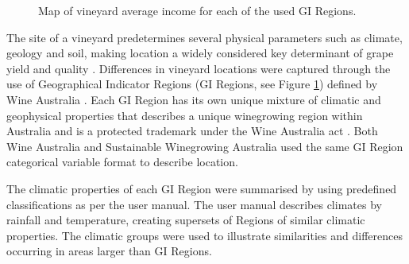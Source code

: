 \documentclass[review,12pt,authoryear]{elsarticle}
\begin{document}
\begin{linenumbers}
\begin{figure}
  \caption{Map of vineyard average income for each of the used GI Regions.}\label{fig:map}
\end{figure}%

\par
The site of a vineyard predetermines several physical parameters such as climate, geology and soil, making location a widely considered key determinant of grape yield and quality \citep{abbalDecisionSupportSystem2016,agostaRegionalClimateVariability2012,fragaMultivariateClusteringViticultural2017}. Differences in vineyard locations were captured through the use of Geographical Indicator Regions (GI Regions, see Figure \ref{fig:map}) defined by Wine Australia \citep{hallidayAustralianWineEncyclopedia2009,oliverReviewSoilPhysical2013,soarClimateDriversRed2008}. Each GI Region has its own unique mixture of climatic and geophysical properties that describes a unique winegrowing region within Australia and is a protected trademark under the Wine Australia act \citep{attorney-generalsdepartmentWineAustraliaCorporation2010}. Both Wine Australia and Sustainable Winegrowing Australia used the same GI Region categorical variable format to describe location.
\par
 The climatic properties of each GI Region were summarised by using predefined classifications as per the \citet{sustainablewinegrowingaustraliaSustainableWinegrowingAustralia2021} user manual. The user manual describes climates by rainfall and temperature, creating supersets of Regions of similar climatic properties. The climatic groups were used to illustrate similarities and differences occurring in areas larger than GI Regions.
\par

\end{linenumbers}
\end{document}
